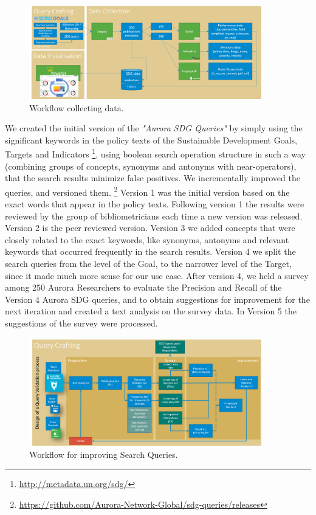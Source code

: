 \documentclass{article}
\begin{document}
\begin{figure}[ht]
	\centering
  \includegraphics[width=0.9\textwidth]{figures/sdg-data-workflow.png}
	\caption{Workflow collecting data.}
	\label{sdgdataworkflow}
\end{figure}

We created the initial version of the \emph{"Aurora SDG Queries"} by simply using the significant keywords in the policy texts of the Sustainable Development Goals, Targets and Indicators \footnote{\url{http://metadata.un.org/sdg/}}, using boolean search operation structure in such a way (combining groups of concepts, synonyms and antonyms with near-operators), that the search results minimize false positives. We incrementally improved the queries, and versioned them. \footnote{\url{https://github.com/Aurora-Network-Global/sdg-queries/releases}} Version 1 was the initial version based on the exact words that appear in the policy texts. Following version 1 the results were reviewed by the group of bibliometricians each time a new version was released. Version 2 is the peer reviewed version. Version 3 we added concepts that were closely related to the exact keywords, like synonyms, antonyms and relevant keywords that occurred frequently in the search results. Version 4 \cite{vanderfeesten_search_2019} we split the search queries from the level of the Goal, to the narrower level of the Target, since it made much more sense for our use case. After version 4, we held a survey \cite{vanderfeesten_survey_2020} among 250 Aurora Researchers to evaluate the Precision and Recall of the Version 4 Aurora SDG queries, and to obtain suggestions for improvement for the next iteration and created a text analysis \cite{vanderfeesten_text_2020} on the survey data. In Version 5 \cite{vanderfeesten_search_2020} the suggestions of the survey were processed. 

\begin{figure}[ht]
	\centering
  \includegraphics[width=0.9\textwidth]{figures/sdg-query-crafting.png}
	\caption{Workflow for improving Search Queries.}
	\label{improvingsearchqueries}
\end{figure}
\end{document}
